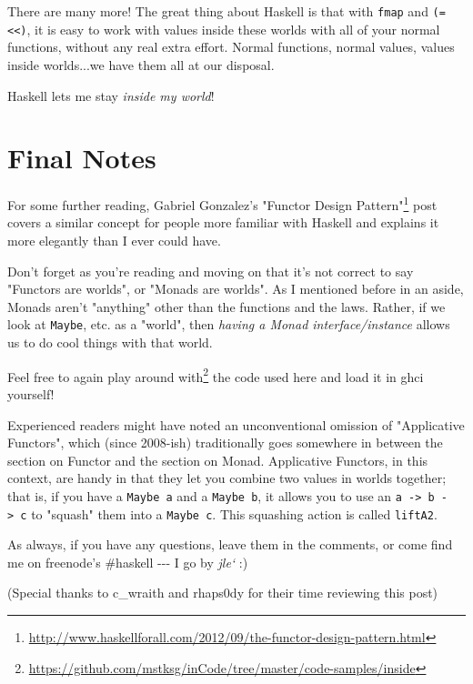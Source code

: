 \documentclass[]{article}
\renewcommand{\href}[2]{#2\footnote{\url{#1}}}
\begin{document}
There are many more! The great thing about Haskell is that with \texttt{fmap}
and \texttt{(=\textless{}\textless{})}, it is easy to work with values inside
these worlds with all of your normal functions, without any real extra effort.
Normal functions, normal values, values inside worlds...we have them all at our
disposal.

Haskell lets me stay \emph{inside my world}!

\section{Final Notes}

For some further reading, Gabriel Gonzalez's
\href{http://www.haskellforall.com/2012/09/the-functor-design-pattern.html}{"Functor
Design Pattern"} post covers a similar concept for people more familiar with
Haskell and explains it more elegantly than I ever could have.

Don't forget as you're reading and moving on that it's not correct to say
"Functors are worlds", or "Monads are worlds". As I mentioned before in an
aside, Monads aren't "anything" other than the functions and the laws. Rather,
if we look at \texttt{Maybe}, etc. as a "world", then \emph{having a Monad
interface/instance} allows us to do cool things with that world.

Feel free to again
\href{https://github.com/mstksg/inCode/tree/master/code-samples/inside}{play
around with} the code used here and load it in ghci yourself!

Experienced readers might have noted an unconventional omission of "Applicative
Functors", which (since 2008-ish) traditionally goes somewhere in between the
section on Functor and the section on Monad. Applicative Functors, in this
context, are handy in that they let you combine two values in worlds together;
that is, if you have a \texttt{Maybe\ a} and a \texttt{Maybe\ b}, it allows you
to use an \texttt{a\ -\textgreater{}\ b\ -\textgreater{}\ c} to "squash" them
into a \texttt{Maybe\ c}. This squashing action is called \texttt{liftA2}.

As always, if you have any questions, leave them in the comments, or come find
me on freenode's \#haskell -\/-\/- I go by \emph{jle`} :)

(Special thanks to c\_wraith and rhaps0dy for their time reviewing this post)
\end{document}

